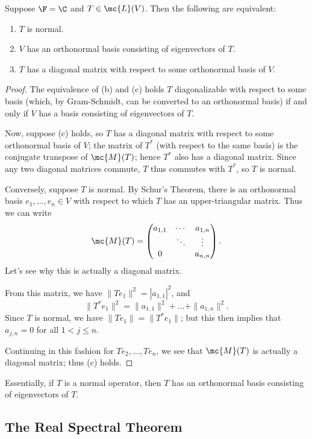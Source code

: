\documentclass[math0540-lecture-notes.tex]{subfiles}
\begin{document}
\begin{theorem}{}
  Suppose $\F=\C$ and $T\in \mc{L}(V)$. Then the following are equivalent:
  \begin{enumerate}
    \item $T$ is normal.
    \item $V$ has an orthonormal basis consisting of eigenvectors of $T$.
    \item $T$ has a diagonal matrix with respect to some orthonormal basis of $V$.
  \end{enumerate}
\end{theorem}
\begin{proof}[Proof]
  The equivalence of (b) and (c) holds $T$ diagonalizable with respect to some basis (which, by
  Gram-Schmidt, can be converted to an orthonormal basis) if and only if $V$ has a basis consisting
  of eigenvectors of $T$.

  Now, suppose (c) holds, so $T$ has a diagonal matrix with respect to some orthonormal basis of
  $V$; the matrix of $T^*$ (with respect to the same basis) is the conjugate transpose of
  $\mc{M}(T)$; hence $T^*$ also has a diagonal matrix. Since any two diagonal matrices commute, $T$
  thus commutes with $T^*$, so $T$ is normal.

  Conversely, suppose $T$ is normal. By Schur's Theorem, there is an orthonormal basis
  $e_1,\ldots,e_n\in V$ with respect to which $T$ has an upper-triangular matrix. Thus we can write
  \[
    \mc{M}(T)=\begin{pmatrix} a_{1,1}&\cdots&a_{1,n}\\ &\ddots&\vdots\\0& &a_{n,n} \end{pmatrix} 
  .\] Let's see why this is actually a diagonal matrix.

  From this matrix, we have $\|Te_1\|^2=\left| a_{1,1} \right| ^2$, and \[
    \|T^*e_1\|^2=\|a_{1,1}\|^2+\ldots+\|a_{1,n}\|^2
  .\] Since $T$ is normal, we have $\|Te_1\|=\|T^*e_1\|$; but this then implies that $a_{j,n}=0$ for
  all $1<j\le n$.

  Continuing in this fashion for $Te_2,\ldots,Te_n$, we see that $\mc{M}(T)$ is actually a diagonal
  matrix; thus (c) holds.
\end{proof}

Essentially, if $T$ is a normal operator, then $T$ has an orthonormal basis consisting of
eigenvectors of $T$.

\subsection{The Real Spectral Theorem}
\end{document}
